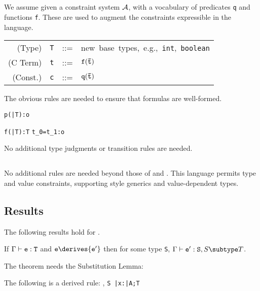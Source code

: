 \subsection{\FXD}
We assume given a constraint system $\cal A$, with a vocabulary of
predicates {\tt q} and functions {\tt f}. These are used to 
augment the constraints expressible in the language. 

\begin{tabular}{r@{\quad}rcl}
  (Type) & {\tt T} & {::=}& \mbox{new base types, e.g., {\tt int}, {\tt boolean}}\\
  (C Term) & {\tt t} &{::=}& $\tt f(\bar{\tt t})$ \\
  (Const.) & {\tt c} &{::=}& ${\tt q(\bar{\tt t})}$ 
\end{tabular}

The obvious rules are needed to ensure that formulas are well-formed.
{\footnotesize
{}
	{\Gamma \vdash \tt p(\bar{\tt T}):o}

	{\Gamma\tt \vdash \tt f(\bar{\tt T}):T}
	{\Gamma\tt \vdash t_0=t_1:o}
}
\noindent
No additional type judgments or transition rules are needed. 

\subsection{\FXGD} 

No additional rules are needed beyond those of \FXG{} and \FXD{}. This
language permits type and value constraints, supporting \FGJ{} style
generics and value-dependent types.


\subsection{Results}
The following results hold for \FXGD.

\begin{theorem} If $\Gamma \vdash {\tt e:T}$ and ${\tt e} \derives {\tt e'}$ then for some type {\tt S}, $\Gamma \vdash {\tt e':S},{S \subtype T}$.
\end{theorem}

The theorem needs the Substitution Lemma:
\begin{lemma} The following is a derived rule:
{\Gamma {}, {\tt S \subtype \bar{\tt x}:\bar{\tt A};T}}
\end{lemma}

